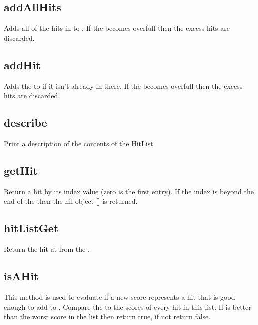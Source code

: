 \begin{itemize}
\subsection{addAllHits}
  \par
  Adds all of the hits in  to . If the  becomes overfull then the excess hits are discarded.

\subsection{addHit}
  \par
  Adds the  to  if it isn't already in there. If the  becomes overfull then the excess hits are discarded.

\subsection{describe}
  \par
  Print a description of the contents of the HitList.

\subsection{getHit}
  \par
  Return a hit by its index value  (zero is the first entry). If the index is beyond the end of the  then the nil object [] is returned.

\subsection{hitListGet}
  \par
  Return the hit at  from the .

\subsection{isAHit}
  \par
  This method is used to evaluate if a new score represents a hit that is good enough to add to .
  Compare the  to the scores of every hit in this list. If  is better than the worst score in the list then return true, if not return false. 


\end{itemize}
